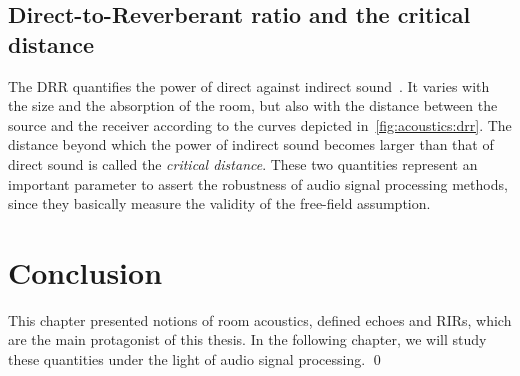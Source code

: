 \subsection{Direct-to-Reverberant ratio and the critical distance}\label{ch:acoustics:subsec:drr}
The \acf{DRR} quantifies the power of direct against indirect sound~.
It varies with the size and the absorption of the room, but also with the distance between the source and the receiver according to the curves depicted in~\cref{fig:acoustics:drr}.
The distance beyond which the power of indirect sound becomes larger than that of direct sound is called the \textit{critical distance}.
These two quantities represent an important parameter to assert the robustness of audio signal processing methods, since they basically measure the validity of the free-field assumption.

\section{Conclusion}
This chapter presented notions of room acoustics, defined echoes and \acp{RIR}, which are the main protagonist of this thesis.
In the following chapter, we will study these quantities under the light of audio signal processing.
\qed